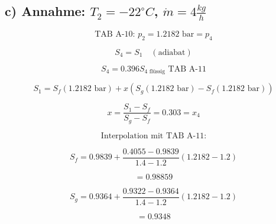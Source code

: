 \subsection*{c) Annahme: \( T_2 = -22^\circ C \), \( \dot{m} = 4 \frac{kg}{h} \)}

\[
\text{TAB A-10: } p_2 = 1.2182 \text{ bar} = p_4
\]

\[
S_4 = S_1 \quad (\text{adiabat})
\]

\[
S_4 = 0.396 S_{4 \text{ flüssig}} \text{ TAB A-11}
\]

\[
S_1 = S_f (1.2182 \text{ bar}) + x (S_g (1.2182 \text{ bar}) - S_f (1.2182 \text{ bar}))
\]

\[
x = \frac{S_1 - S_f}{S_g - S_f} = 0.303 = x_4
\]

\[
\text{Interpolation mit TAB A-11:}
\]

\[
S_f = 0.9839 + \frac{0.4055 - 0.9839}{1.4 - 1.2} (1.2182 - 1.2)
\]

\[
= 0.98859
\]

\[
S_g = 0.9364 + \frac{0.9322 - 0.9364}{1.4 - 1.2} (1.2182 - 1.2)
\]

\[
= 0.9348
\]
